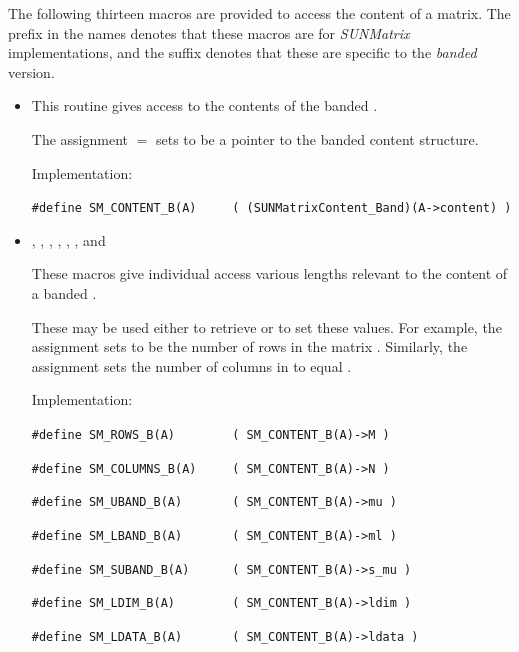 \noindent The following thirteen macros are provided to access the
content of a {\sunmatband} matrix. The prefix  in the names
denotes that these macros are for \emph{SUNMatrix} implementations,
and the suffix  denotes that these are specific to
the \emph{banded} version.
\begin{itemize}

\item {}
    
  This routine gives access to the contents of the
  banded .
  
  The assignment  $=$  sets           
   to be a pointer to the banded  content  
  structure.                                             
                                                            
  Implementation: 
  
  \verb|#define SM_CONTENT_B(A)     ( (SUNMatrixContent_Band)(A->content) )|
  
\item {}, , , , , , and 

  These macros give individual access various lengths relevant to the
  content of a banded .                        
                                                               
  These may be used either to retrieve or to set these values.  For
  example, the assignment  sets  to be
  the number of rows in the matrix .  Similarly, the
  assignment  sets the number of
  columns in  to equal .
  
  Implementation: 
  
  \verb|#define SM_ROWS_B(A)        ( SM_CONTENT_B(A)->M )|

  \verb|#define SM_COLUMNS_B(A)     ( SM_CONTENT_B(A)->N )|

  \verb|#define SM_UBAND_B(A)       ( SM_CONTENT_B(A)->mu )|

  \verb|#define SM_LBAND_B(A)       ( SM_CONTENT_B(A)->ml )|

  \verb|#define SM_SUBAND_B(A)      ( SM_CONTENT_B(A)->s_mu )|

  \verb|#define SM_LDIM_B(A)        ( SM_CONTENT_B(A)->ldim )|

  \verb|#define SM_LDATA_B(A)       ( SM_CONTENT_B(A)->ldata )|


\end{itemize}
